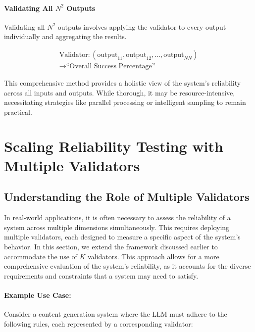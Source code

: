 \documentclass{article}
\begin{document}
\paragraph{Validating All \( N^2 \) Outputs}

Validating all \( N^2 \) outputs involves applying the validator to every output individually and aggregating the results.

\begin{equation*}
\begin{split}
\text{Validator}: (\text{output}_{11}, \text{output}_{12}, \ldots, \text{output}_{NN}) \\ \rightarrow \text{``Overall Success Percentage''}
\end{split}
\end{equation*}

This comprehensive method provides a holistic view of the system's reliability across all inputs and outputs. While thorough, it may be resource-intensive, necessitating strategies like parallel processing or intelligent sampling to remain practical.

\pagebreak
\section{Scaling Reliability Testing with Multiple Validators}

\subsection{Understanding the Role of Multiple Validators}

In real-world applications, it is often necessary to assess the reliability of a system across multiple dimensions simultaneously. This requires deploying multiple validators, each designed to measure a specific aspect of the system's behavior. In this section, we extend the framework discussed earlier to accommodate the use of \( K \) validators. This approach allows for a more comprehensive evaluation of the system's reliability, as it accounts for the diverse requirements and constraints that a system may need to satisfy.

\paragraph{Example Use Case:}

Consider a content generation system where the LLM must adhere to the following rules, each represented by a corresponding validator:
\end{document}
